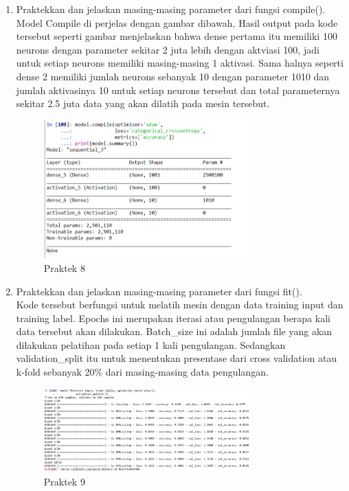 \begin{enumerate}
\item  Praktekkan dan jelaskan masing-masing parameter dari fungsi compile().
	\hfill\\
	Model Compile di perjelas dengan gambar dibawah, Hasil output pada kode tersebut seperti gambar  menjelaskan bahwa dense pertama itu memiliki 100 neurons dengan parameter sekitar 2 juta lebih dengan aktviasi 100, jadi untuk setiap neurons memiliki masing-masing 1 aktivasi. Sama halnya seperti dense 2 memiliki jumlah neurons sebanyak 10 dengan parameter 1010 dan jumlah aktivasinya 10 untuk setiap neurons tersebut dan total parameternya sekitar 2.5 juta data yang akan dilatih pada mesin tersebut.
		
\begin{figure}[H]
    \includegraphics[width=8cm]{figures/1174084/6/11.png}
    \centering
    \caption{Praktek 8}
\end{figure}

\item  Praktekkan dan jelaskan masing-masing parameter dari fungsi ﬁt().
	\hfill\\
	Kode tersebut berfungsi untuk melatih mesin dengan data training input dan training label. Epochs ini merupakan iterasi atau pengulangan berapa kali data tersebut akan dilakukan. Batch\_size ini adalah jumlah file yang akan dilakukan pelatihan pada setiap 1 kali pengulangan. Sedangkan validation\_split itu untuk menentukan presentase dari cross validation atau k-fold sebanyak 20\% dari masing-masing data pengulangan.
	
\begin{figure}[H]
    \includegraphics[width=8cm]{figures/1174084/6/12.png}
    \centering
    \caption{Praktek 9}
\end{figure}



\end{enumerate}
